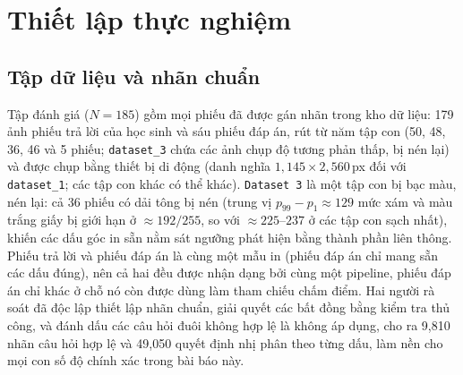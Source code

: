 \documentclass[conference]{IEEEtran}
\begin{document}
\section{Thiết lập thực nghiệm}

\subsection{Tập dữ liệu và nhãn chuẩn}
Tập đánh giá ($N{=}185$) gồm mọi phiếu đã được gán nhãn trong kho dữ liệu: 179 ảnh
phiếu trả lời của học sinh và sáu phiếu đáp án, rút từ năm tập con (50, 48, 36, 46
và 5 phiếu; \texttt{dataset\_3} chứa các ảnh chụp độ tương phản thấp, bị nén lại)
và được chụp bằng thiết bị di động (danh nghĩa $1{,}145\times2{,}560$\,px đối với
\texttt{dataset\_1}; các tập con khác có thể khác). \texttt{Dataset~3} là một tập
con bị bạc màu, nén lại: cả 36 phiếu có dải tông bị nén (trung vị
$p_{99}-p_{1}\approx129$ mức xám và màu trắng giấy bị giới hạn ở
$\approx192/255$, so với $\approx225$–$237$ ở các tập con sạch nhất), khiến các
dấu góc in sẵn nằm sát ngưỡng phát hiện bằng thành phần liên thông. Phiếu trả lời
và phiếu đáp án là cùng một mẫu in (phiếu đáp án chỉ mang sẵn các dấu đúng), nên
cả hai đều được nhận dạng bởi cùng một pipeline, phiếu đáp án chỉ khác ở chỗ nó
còn được dùng làm tham chiếu chấm điểm. Hai người rà soát đã độc lập thiết lập
nhãn chuẩn, giải quyết các bất đồng bằng kiểm tra thủ công, và đánh dấu các câu
hỏi đuôi không hợp lệ là không áp dụng, cho ra 9{,}810 nhãn câu hỏi hợp lệ và
49{,}050 quyết định nhị phân theo từng dấu, làm nền cho mọi con số độ chính xác
trong bài báo này.
\end{document}
